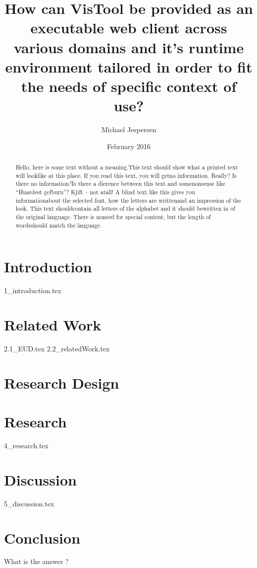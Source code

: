 \documentclass[12pt, paperA4]{article}
\title{How can VisTool be provided as an executable web client across various domains and it's runtime environment tailored in order to fit the needs of specific context of use?}
\author{Michael Jespersen}
\date{February 2016}
\begin{document}
\maketitle

\clearpage

\begin{abstract}
Hello, here is some text without a meaning.This text should show what a printed text will looklike at this place. If you read this text, you will getno information.  Really?  Is there no information?Is  there  a  dierence  between  this  text  and  somenonsense like “Huardest gefburn”?  Kjift – not atall!   A  blind  text  like  this  gives  you  informationabout the selected font, how the letters are writtenand  an  impression  of  the  look.   This  text  shouldcontain all letters of the alphabet and it should bewritten  in  of  the  original  language.   There  is  noneed for special content,  but the length of wordsshould match the language.
\end{abstract}

\clearpage

\tableofcontents

\clearpage

\section{Introduction}
{1_introduction.tex}

\section{Related Work}
{2.1_EUD.tex}
{2.2_relatedWork.tex}

\section{Research Design}

\section{Research}
{4_research.tex}


\section{Discussion}
{5_discussion.tex}

\section{Conclusion}
What is the answer ?
\end{document}
